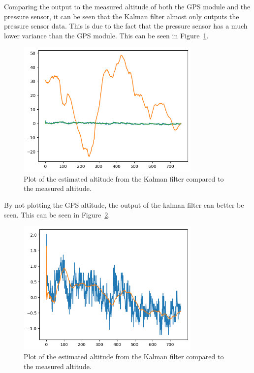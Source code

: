 Comparing the output to the measured altitude of both the GPS module and the pressure sensor, it can be seen that the Kalman filter almost only outputs the pressure sensor data.
This is due to the fact that the pressure sensor has a much lower variance than the GPS module.
This can be seen in Figure~\ref{fig:kalman-filter-test-compare}.
\begin{figure}[H]
    \centering
    \includegraphics[width=0.8\textwidth]{chapters/05Results/figures/filtere_pres_gpsalt}
    \caption{Plot of the estimated altitude from the Kalman filter compared to the measured altitude.}
    \label{fig:kalman-filter-test-compare}
\end{figure}

By not plotting the GPS altitude, the output of the kalman filter can better be seen.
This can be seen in Figure~\ref{fig:kalman-filter-test-compare-no-gps}.
\begin{figure}[H]
    \centering
    \includegraphics[width=0.8\textwidth]{chapters/05Results/figures/filtered_state_bar_alt}
    \caption{Plot of the estimated altitude from the Kalman filter compared to the measured altitude.}
    \label{fig:kalman-filter-test-compare-no-gps}
\end{figure}

